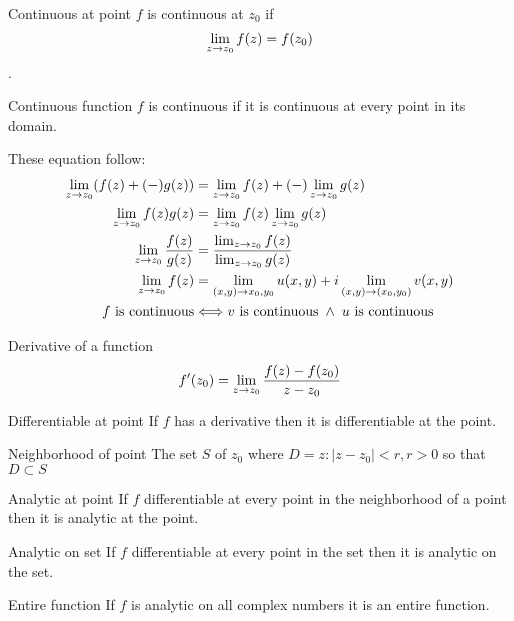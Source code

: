 \documentclass{amsbook}
\begin{document}
\begin{mydef}{Continuous at point}
$f$ is continuous at $z_0$ if \[\lim_{{z} \to z_0} f(z) = f(z_0)\].
\end{mydef}

\begin{mydef}{Continuous function}
$f$ is continuous if it is continuous at every point in its domain.
\end{mydef}

\newcommand {\limitz}[0]{\limit z {z_0}}
These equation follow:
\begin{align}
\limitz (f(z) + (-) g(z)) &= \limitz f(z) +(-) \limitz g(z) \\
\limitz f(z)g(z)  &= \limitz f(z) \limitz g(z) \\
\limitz \frac{f(z)}{g(z)}  &= \frac {\limitz f(z)} {\limitz g(z)} \\
\limitz f(z) &= \limit {(x,y)}{x_0,y_0} u(x,y) + i \limit{(x,y)}{(x_0,y_0)} v(x,y) \\
f \mbox{ is continuous} &\iif v \mbox{ is continuous} \myand u \mbox{ is continuous} \\
\end{align} 

\begin{mydef}{Derivative of a function}
\[f'(z_0)= \limitz \frac{f(z)-f(z_0)} {z - z_0} \] 
\end{mydef}

\begin{mydef}{Differentiable at point}
If $f$ has a derivative then it is differentiable at the point.
\end{mydef}

\begin{mydef}{Neighborhood of point}
The set $S$ of $z_0$ where $D = {z : |z - z_0| < r, r > 0}$ so that $D \subset S$
\end{mydef}

\begin{mydef}{Analytic at point}
If $f$ differentiable at every point in the neighborhood of a point then it is analytic at the point.
\end{mydef}

\begin{mydef}{Analytic on set}
If $f$ differentiable at every point in the set then it is analytic on the set.
\end{mydef}

\begin{mydef}{Entire function}
If $f$ is analytic on all complex numbers it is an entire function.
\end{mydef}



\end{document}
